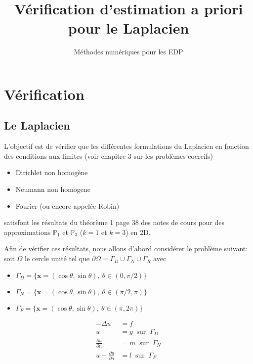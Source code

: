 \documentclass[11pt,utf8]{article}
\title{Vérification d'estimation a priori pour le Laplacien}
\author{Méthodes numériques pour les EDP}
\date{}
\begin{document}
\maketitle

\section{Vérification}
\label{sec:verification-1}


\subsection{Le Laplacien}
\label{sec:le-laplacian}


L'objectif est de vérifier que les différentes formulations du Laplacien en
fonction des conditions aux limites (voir chapitre 3 sur les problèmes
coercifs)
\begin{itemize}
\item Dirichlet non homogène
\item Neumann non homogene
\item Fourier (ou encore appelée Robin)
\end{itemize}
satisfont les résultats du théorème 1 page 38 des notes de cours pour des approximations $\mathbb{P}_1$ et
$\mathbb{P}_3$ ($k=1$ et $k=3$) en 2D.

Afin de vérifier ces résultats, nous allons d'abord considérer le problème suivant:
soit $\Omega$ le cercle unité tel que $\partial \Omega = \Gamma_D \cup
\Gamma_N \cup \Gamma_R$ avec
\begin{itemize}
\item $\Gamma_D = \{\mathbf{x} = (\cos\theta,\sin\theta),\ \theta \in (0,\pi/2) \}$
\item $\Gamma_N = \{\mathbf{x} = (\cos\theta,\sin\theta),\ \theta \in (\pi/2,\pi) \}$
\item $\Gamma_F = \{\mathbf{x} = (\cos\theta,\sin\theta),\ \theta \in (\pi,2\pi) \}$
\end{itemize}

\begin{equation}
  \label{eq:3}
  \begin{split}
    -\Delta u &= f\\
    u &= g\ \mbox{ sur }\ \Gamma_D\\
    \frac{\partial u}{\partial n} &= m\ \mbox{ sur }\ \Gamma_N\\
    u + \frac{\partial u}{\partial n} &= l\ \mbox{ sur }\ \Gamma_F\\
  \end{split}
\end{equation}
\end{document}
